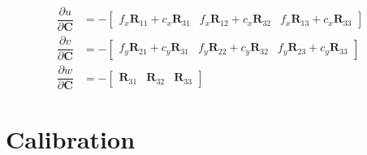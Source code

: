 \documentclass{article}
\renewcommand{\Vec}[1]{{\mathbf{#1}}}
\newcommand{\camRot}{{\Vec{R}}}
\newcommand{\camPos}{{\Vec{C}}}
\begin{document}
\begin{align}
  \dfrac{\partial{u}}{\partial{\camPos}} &=
    -\begin{bmatrix}
      f_{x} \camRot_{11} + c_{x} \camRot_{31} &
      f_{x} \camRot_{12} + c_{x} \camRot_{32} &
      f_{x} \camRot_{13} + c_{x} \camRot_{33}
    \end{bmatrix} \\
  \dfrac{\partial{v}}{\partial{\camPos}} &=
    -\begin{bmatrix}
      f_{y} \camRot_{21} + c_{y} \camRot_{31} &
      f_{y} \camRot_{22} + c_{y} \camRot_{32} &
      f_{y} \camRot_{23} + c_{y} \camRot_{33}
    \end{bmatrix} \\
  \dfrac{\partial{w}}{\partial{\camPos}} &=
    -\begin{bmatrix}
      \camRot_{31} &
      \camRot_{32} &
      \camRot_{33}
    \end{bmatrix}
\end{align}



\newpage
\section{Calibration}




\newpage


\end{document}
